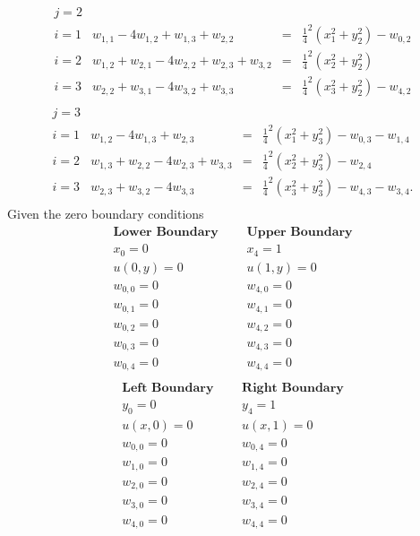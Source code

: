 \[\begin{array}{l|rcl}
j=2\\
i=1&w_{1,1}-4w_{1,2}+w_{1,3}+w_{2,2}&=&\frac{1}{4}^2(x_1^2+y_2^2)-w_{0,2}\\
i=2&w_{1,2}+w_{2,1}-4w_{2,2}+w_{2,3}+w_{3,2}&=&\frac{1}{4}^2(x_2^2+y_2^2)\\
i=3&w_{2,2}+w_{3,1}-4w_{3,2}+w_{3,3}&=&\frac{1}{4}^2(x_3^2+y_2^2)-w_{4,2}\\
\end{array}
\]	
\[\begin{array}{l|rcl}
j=3\\
i=1&w_{1,2}-4w_{1,3}+w_{2,3}&=&\frac{1}{4}^2(x_1^2+y_3^2)-w_{0,3}-w_{1,4}\\
i=2&w_{1,3}+w_{2,2}-4w_{2,3}+w_{3,3}&=&\frac{1}{4}^2(x_2^2+y_3^2)-w_{2,4}\\
i=3&w_{2,3}+w_{3,2}-4w_{3,3}&=&\frac{1}{4}^2(x_3^2+y_3^2)-w_{4,3}-w_{3,4}.\\
\end{array}
\]	
Given the zero boundary conditions
\[
\begin{array}{lcl}
\textbf{Lower Boundary}&\ \ \ & \textbf{Upper Boundary} \\
x_0=0&\ \ \ & x_4=1\\
u(0,y)=0&\ \ \ & u(1,y)=0\\
w_{0,0}=0 &\ \ \ & w_{4,0}=0 \\ 
w_{0,1}=0& \ \ \ & w_{4,1}=0 \\
w_{0,2}=0 & \ \ \ & w_{4,2}=0  \\
w_{0,3}=0& \ \ \ & w_{4,3}=0  \\
w_{0,4}=0 & \ \ \ & w_{4,4}=0  \\

\end{array}
\]
\[
\begin{array}{lcl}
\textbf{Left Boundary}&\ \ \ & \textbf{Right Boundary} \\
y_0=0&\ \ \ & y_4=1 \\
u(x,0)=0&\ \ \ & u(x,1)=0 \\

w_{0,0}=0 & \ \ \ & w_{0,4}=0\\ 
w_{1,0}=0  & \ \ \ & w_{1,4}=0 \\
w_{2,0}=0  & \ \ \ & w_{2,4}=0 \\
w_{3,0}=0  & \ \ \ & w_{3,4}=0 \\
w_{4,0}=0  & \ \ \ & w_{4,4}=0 \\

\end{array}
\]

